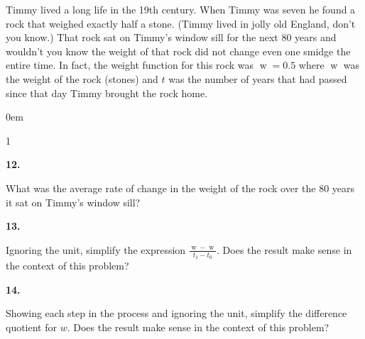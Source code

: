 \documentclass[12pt,]{book}
\theoremstyle{plain}
\theoremstyle{definition}
\numberwithin{equation}{section}
\newenvironment{exercisegroup}%
{\medskip\noindent}%
{\par\bigskip}%
\newlength{\exercisegroupindent}%
\newlength{\exercisegroupitemwidth}%
\newenvironment{exercisegrouplist}%
{\vspace{-\partopsep}%
\begin{adjustwidth}{\exercisegroupindent}{0em}}%
{\end{adjustwidth}%
\vspace{-\partopsep}%
\vspace{\baselineskip}}%
\newenvironment{exercisegroupbycol}[1]%
{\begin{exercisegrouplist}%
\vspace{-\multicolsep}%
\begin{multicols}{#1}%
\setlength{\parindent}{0em}%
\setlength{\exercisegroupitemwidth}{\linewidth}}%
{\end{multicols}%
\vspace{-\multicolsep}%
\end{exercisegrouplist}}%
\newenvironment{exercisegroupitem}[1]%
{\begin{minipage}[t]{\exercisegroupitemwidth}
\vspace{0pt}%
{\bfseries#1}%
\rule{0pt}{\baselineskip}}{\strut%
\end{minipage}%
\hspace{\columnsep}}%
\providecommand\phantomsection{}
\newcommand{\fe}[2]{\mathop{{#1}{\left(#2\right)}}}
\begin{document}
\begin{exercisegroup}%
Timmy lived a long life in the 19th century. When Timmy was seven he found a rock that weighed exactly half a stone. (Timmy lived in jolly old England, don't you know.) That rock sat on Timmy's window sill for the next 80 years and wouldn't you know the weight of that rock did not change even one smidge the entire time. In fact, the weight function for this rock was \(\fe{w}{t}=0.5\) where \(\fe{w}{t}\) was the weight of the rock (stones) and \(t\) was the number of years that had passed since that day Timmy brought the rock home.%
\par
\begin{exercisegroupbycol}{1}%
\begin{exercisegroupitem}{12. }\phantomsection\hypertarget{exercise-20}{\null}
What was the average rate of change in the weight of the rock over the 80 years it sat on Timmy's window sill?%
\end{exercisegroupitem}%
\par%
\begin{exercisegroupitem}{13. }\phantomsection\hypertarget{exercise-21}{\null}
Ignoring the unit, simplify the expression \(\frac{\fe{w}{t_1}-\fe{w}{t_0}}{t_1-t_0}\). Does the result make sense in the context of this problem?%
\end{exercisegroupitem}%
\par%
\begin{exercisegroupitem}{14. }\phantomsection\hypertarget{exercise-22}{\null}
Showing each step in the process and ignoring the unit, simplify the difference quotient for \(w\). Does the result make sense in the context of this problem?%
\end{exercisegroupitem}%
\par%
\end{exercisegroupbycol}%
\end{exercisegroup}%
\end{document}
